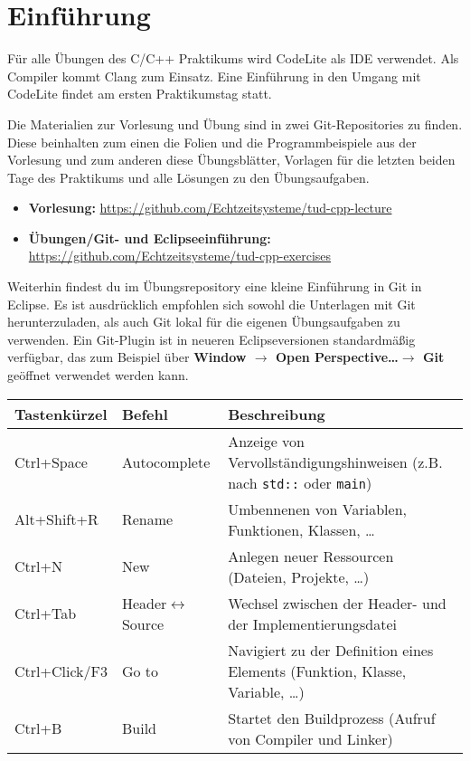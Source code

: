 
\section*{Einführung}
Für alle Übungen des C/C++ Praktikums wird CodeLite als IDE verwendet. Als Compiler kommt Clang zum Einsatz.
Eine Einführung in den Umgang mit CodeLite findet am ersten Praktikumstag statt.

Die Materialien zur Vorlesung und Übung sind in zwei Git-Repositories zu finden.
Diese beinhalten zum einen die Folien und die Programmbeispiele aus der Vorlesung und zum anderen diese Übungsblätter, Vorlagen für die letzten beiden Tage des Praktikums und alle Lösungen zu den Übungsaufgaben.

\begin{itemize}
	\item \textbf{Vorlesung:} \url{https://github.com/Echtzeitsysteme/tud-cpp-lecture}
	\item \textbf{Übungen/Git- und Eclipseeinführung:} \url{https://github.com/Echtzeitsysteme/tud-cpp-exercises}
\end{itemize}

Weiterhin findest du im Übungsrepository eine kleine Einführung in Git in Eclipse.
Es ist ausdrücklich empfohlen sich sowohl die Unterlagen mit Git herunterzuladen, als auch Git lokal für die eigenen Übungsaufgaben zu verwenden.
Ein Git-Plugin ist in neueren Eclipseversionen standardmäßig verfügbar, das zum Beispiel über \textbf{Window $\rightarrow$ Open Perspective\dots $\rightarrow$ Git}  geöffnet verwendet werden kann.


\begin{tabular}{l|l|p{11.5cm}}
    \toprule
    \textbf{Tastenkürzel} & \textbf{Befehl} & \textbf{Beschreibung}\\
    \midrule
	Ctrl+Space & Autocomplete &
	Anzeige von Vervollständigungshinweisen (z.B. nach \texttt{std::} oder \texttt{main})
	\\
	Alt+Shift+R & Rename &
	Umbennenen von Variablen, Funktionen, Klassen, \dots
	\\
	Ctrl+N & New &
	Anlegen neuer Ressourcen (Dateien, Projekte, \dots)
	\\
	Ctrl+Tab & Header$\leftrightarrow$Source &
	Wechsel zwischen der Header- und der Implementierungsdatei
	\\
	Ctrl+Click/F3 & Go to &
	Navigiert zu der Definition eines Elements (Funktion, Klasse, Variable, \dots)
	\\
	Ctrl+B & Build &
	Startet den Buildprozess (Aufruf von Compiler und Linker)
    \\\bottomrule
\end{tabular}
